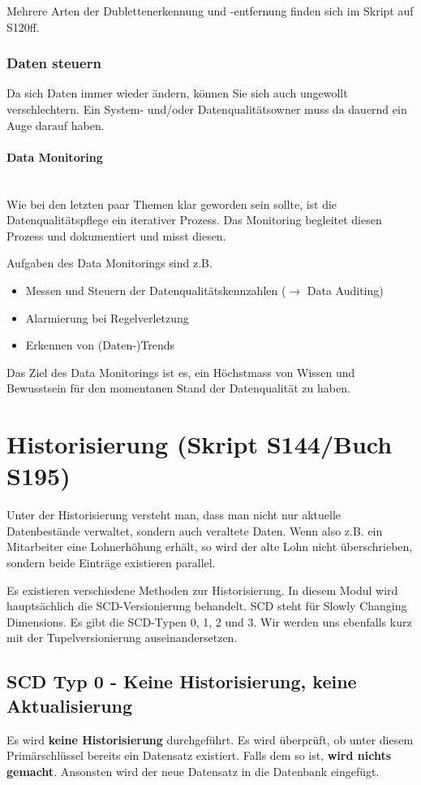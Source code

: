 \documentclass[a4paper, 11pt, nofootinbib]{article}
\begin{document}
\noindent Mehrere Arten der Dublettenerkennung und -entfernung finden sich im Skript auf S120ff.

\newpage

\subsubsection{Daten steuern}
Da sich Daten immer wieder ändern, können Sie sich auch ungewollt verschlechtern. Ein System- und/oder Datenqualitätsowner muss da dauernd ein Auge darauf haben.

\paragraph{Data Monitoring}\mbox{}\\
Wie bei den letzten paar Themen klar geworden sein sollte, ist die Datenqualitätspflege ein iterativer Prozess. Das Monitoring begleitet diesen Prozess und dokumentiert und misst diesen.

Aufgaben des Data Monitorings sind z.B. 
\begin{itemize}
	\item Messen und Steuern der Datenqualitätskennzahlen ($\rightarrow$ Data Auditing)
	\item Alarmierung bei Regelverletzung
	\item Erkennen von (Daten-)Trends
\end{itemize}

Das Ziel des Data Monitorings ist es, ein Höchstmass von Wissen und Bewusstsein für den momentanen Stand der Datenqualität zu haben.

\newpage

\section{Historisierung (Skript S144/Buch S195)}
Unter der Historisierung versteht man, dass man nicht nur aktuelle Datenbestände verwaltet, sondern auch veraltete Daten. Wenn also z.B. ein Mitarbeiter eine Lohnerhöhung erhält, so wird der alte Lohn nicht überschrieben, sondern beide Einträge existieren parallel.

Es existieren verschiedene Methoden zur Historisierung. In diesem Modul wird hauptsächlich die SCD-Versionierung behandelt. SCD steht für Slowly Changing Dimensions. Es gibt die SCD-Typen 0, 1, 2 und 3. Wir werden uns ebenfalls kurz mit der Tupelversionierung auseinandersetzen.

\subsection{SCD Typ 0 - Keine Historisierung, keine Aktualisierung}
Es wird \textbf{keine Historisierung} durchgeführt. Es wird überprüft, ob unter diesem Primärschlüssel bereits ein Datensatz existiert. Falls dem so ist, \textbf{wird nichts gemacht}. Ansonsten wird der neue Datensatz in die Datenbank eingefügt.
\end{document}
